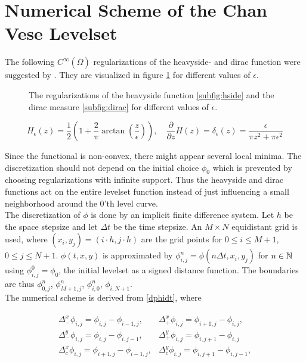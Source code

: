 \section{Numerical Scheme of the Chan Vese Levelset}\label{section:numscheme}
The following $C^\infty(\overline{\Omega})$ regularizations of the heavyside- and dirac function were suggested by \cite{chan.01}. They are visualized in figure \ref{fig:regularizations} for different values of $\epsilon$.
\begin{figure}
  \centering
  \quad
  \caption{The regularizations of the heavyside function \ref{subfig:hside} and the dirac measure \ref{subfig:dirac} for different values of $\epsilon$.}\label{fig:regularizations}
\end{figure}

\begin{equation}
  H_\epsilon(z) = \frac{1}{2}\left(1+\frac{2}{\pi}\arctan\left(\frac{z}{\epsilon}\right)\right),\quad \frac{\partial}{\partial z}H(z) = \delta_\epsilon(z) = \frac{\epsilon}{\pi z^2+\pi\epsilon^2}
\end{equation}

Since the functional is non-convex, there might appear several local minima. The discretization should not depend on the initial choice $\phi_0$ which is prevented by choosing regularizations with infinite support. Thus the heavyside and dirac functions act on the entire levelset function instead of just influencing a small neighborhood around the 0'th level curve.\\

The discretization of $\phi$ is done by an implicit finite difference system. Let $h$ be the space stepsize and let $\Delta t$ be the time stepsize. An $M\times N$ equidistant grid is used, where $(x_i,y_j) = (i\cdot h,j\cdot h)$ are the grid points for $0\leq i \leq M+1$, $0\leq j \leq N+1$. $\phi(t,x,y)$ is approximated by $\phi_{i,j}^n = \phi(n\Delta t, x_i,y_j)$ for $n\in\mathbb N$ using $\phi_{i,j}^0 = \phi_0$, the initial levelset as a signed distance function. The boundaries are thus $\phi_{0,j}^n$, $\phi_{M+1,j}^n$, $\phi_{i,0}^n$, $\phi_{i,N+1}$.\\

The numerical scheme is derived from \eqref{dphidt}, where 

\begin{align}
\begin{array}{ll}
\Delta_{-}^x \phi_{i,j} = \phi_{i,j}-\phi_{i-1,j}, & \Delta_{+}^x \phi_{i,j} = \phi_{i+1,j}-\phi_{i,j},\\
\Delta_{-}^y \phi_{i,j} = \phi_{i,j}-\phi_{i,j-1}, & \Delta_{+}^y \phi_{i,j} = \phi_{i,j+1}-\phi_{i,j}\\
\Delta_c^x  \phi_{i,j} = \phi_{i+1,j}-\phi_{i-1,j},& \Delta_c^y \phi_{i,j} = \phi_{i,j+1}-\phi_{i,j-1},
\end{array}
\end{align}

